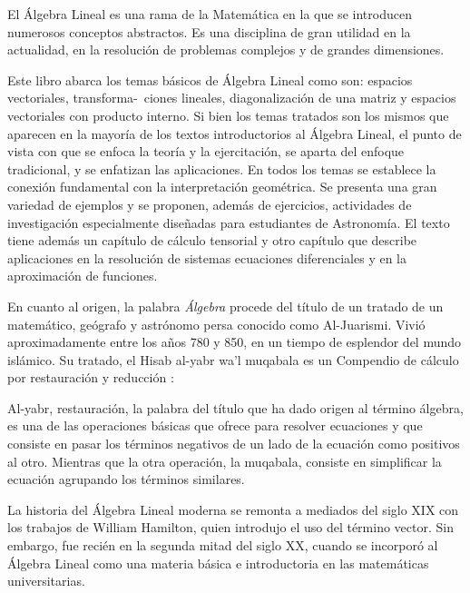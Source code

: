 \documentclass[a4paper,12pt,twopage]{book}
\begin{document}
El Álgebra Lineal es  una rama de la Matemática en la que se introducen numerosos conceptos abstractos. Es una disciplina de gran utilidad en la actualidad, en la resolución de problemas complejos y de grandes dimensiones. 

Este libro abarca los temas básicos de Álgebra Lineal   como son: espacios vectoriales, transforma-\ ciones lineales, diagonalización de una matriz y espacios vectoriales con producto interno. Si bien los temas tratados  son los mismos que aparecen en la mayoría de los textos introductorios al Álgebra Lineal, el punto de vista con que se enfoca la teoría y la ejercitación, se aparta del enfoque tradicional, y se enfatizan las aplicaciones. 
En todos los temas se establece la conexión fundamental con la interpretación geométrica. Se presenta una gran variedad de ejemplos y se proponen, además de ejercicios, actividades de investigación especialmente diseñadas para estudiantes de Astronomía. El texto tiene además un capítulo de cálculo tensorial y otro capítulo que describe  aplicaciones en la resolución de sistemas  ecuaciones diferenciales y en la aproximación de  funciones.  




En cuanto al origen, la palabra \textit{Álgebra}  procede del título de un  tratado  de un matemático, geógrafo y astrónomo persa conocido como Al-Juarismi. Vivió aproximadamente entre los años  780 y  850, en un tiempo de esplendor del mundo islámico. Su tratado,  el Hisab al-yabr wa’l muqabala  es un Compendio de cálculo por restauración y reducción \cite{lavanguardia}:
\begin{parchment}[Al-yabr]
{Al-yabr, restauración, la palabra del título que ha dado origen al término álgebra, es una de las operaciones básicas que ofrece para resolver ecuaciones y que consiste en pasar los términos negativos de un lado de la ecuación como positivos al otro. Mientras que la otra operación, la muqabala, consiste en simplificar la ecuación agrupando los términos similares.}
\end{parchment}
La historia del Álgebra Lineal moderna se remonta a mediados del siglo XIX con los trabajos de William Hamilton, quien introdujo el uso del término vector. Sin embargo, fue recién en la segunda mitad del siglo XX, cuando se incorporó al Álgebra Lineal   como una materia básica e introductoria en las matemáticas universitarias. 
\end{document}
